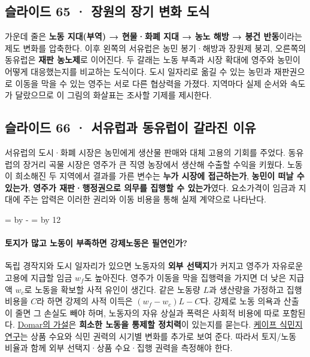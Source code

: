 \documentclass[10pt,a4paper]{article}
\newcommand{\ReserveQuestionSpace}{%
  \par\begingroup
  \dimen0=\pagegoal \advance\dimen0 by -\pagetotal
  \dimen2=\baselineskip \multiply\dimen2 by 12
  \ifdim\dimen0<\dimen2 \newpage\fi
  \endgroup}
\begin{document}
\subsection{슬라이드 65 · 장원의 장기 변화 도식}
가운데 줄은 \textbf{노동 지대(부역) → 현물·화폐 지대 → 농노 해방 → 봉건 반동}이라는 제도 변화를 압축한다. 이후 왼쪽의 서유럽은 농민 봉기·해방과 장원제 붕괴, 오른쪽의 동유럽은 \textbf{재판 농노제}로 이어진다. 두 갈래는 노동 부족과 시장 확대에 영주와 농민이 어떻게 대응했는지를 비교하는 도식이다. 도시 일자리로 옮길 수 있는 농민과 재판권으로 이동을 막을 수 있는 영주는 서로 다른 협상력을 가졌다. 지역마다 실제 순서와 속도가 달랐으므로 이 그림의 화살표는 조사할 기제를 제시한다.\par

\subsection{슬라이드 66 · 서유럽과 동유럽이 갈라진 이유}
서유럽의 도시·화폐 시장은 농민에게 생산물 판매와 대체 고용의 기회를 주었다. 동유럽의 장거리 곡물 시장은 영주가 큰 직영 농장에서 생산해 수출할 수익을 키웠다. 노동이 희소해진 두 지역에서 결과를 가른 변수는 \textbf{누가 시장에 접근하는가}, \textbf{농민이 떠날 수 있는가}, \textbf{영주가 재판·행정권으로 의무를 집행할 수 있는가}였다. 요소가격이 임금과 지대에 주는 압력은 이러한 권리와 이동 비용을 통해 실제 계약으로 나타난다.\par

\ReserveQuestionSpace
\paragraph{토지가 많고 노동이 부족하면 강제노동은 필연인가?}
독립 경작지와 도시 일자리가 있으면 노동자의 \textbf{외부 선택지}가 커지고 영주가 자유로운 고용에 지급할 임금 $w_f$도 높아진다. 영주가 이동을 막을 집행력을 가지면 더 낮은 지급액 $w_c$로 노동을 확보할 사적 유인이 생긴다. 같은 노동량 $L$과 생산량을 가정하고 집행비용을 $C$라 하면 강제의 사적 이득은 $(w_f-w_c)L-C$다. 강제로 노동 의욕과 산출이 줄면 그 손실도 빼야 하며, 노동자의 자유 상실과 폭력은 사회적 비용에 따로 포함된다. \href{https://www.cambridge.org/core/journals/journal-of-economic-history/article/abs/causes-of-slavery-or-serfdom-a-hypothesis/B6055D4D909C9D21B79BB42D2CD952C5}{Domar의 가설}은 \textbf{희소한 노동을 통제할 정치력}이 있는지를 묻는다. \href{https://www.cambridge.org/core/journals/international-review-of-social-history/article/economics-of-slavery-in-the-eighteenthcentury-cape-colony-revising-the-nieboerdomar-hypothesis/B7EB0A6EC343E570F6D339D8BB1EAC2F}{케이프 식민지 연구}는 상품 수요와 식민 권력의 시기별 변화를 추가로 보여 준다. 따라서 토지/노동 비율과 함께 외부 선택지·상품 수요·집행 권력을 측정해야 한다.\par
\end{document}
